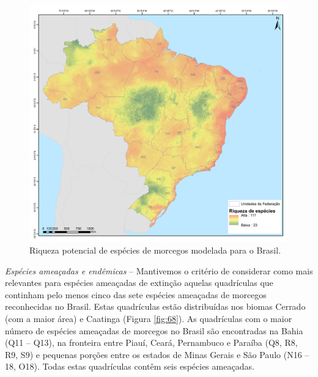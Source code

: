 \documentclass[
  oneside]{scrbook}
\begin{document}
\begin{figure}[H]

{\centering \includegraphics[width=0.75\linewidth]{imagens/cap09/Figura_9.1} 

}

\caption{Riqueza potencial de espécies de morcegos modelada para o Brasil.}\label{fig:67}
\end{figure}

\emph{Espécies ameaçadas e endêmicas} -- Mantivemos o critério de considerar como mais relevantes para espécies ameaçadas de extinção aquelas quadrículas que continham pelo menos cinco das sete espécies ameaçadas de morcegos reconhecidas no Brasil. Estas quadrículas estão distribuídas nos biomas Cerrado (com a maior área) e Caatinga (Figura \ref{fig:68}). As quadrículas com o maior número de espécies ameaçadas de morcegos no Brasil são encontradas na Bahia (Q11 -- Q13), na fronteira entre Piauí, Ceará, Pernambuco e Paraíba (Q8, R8, R9, S9) e pequenas porções entre os estados de Minas Gerais e São Paulo (N16 -- 18, O18). Todas estas quadrículas contêm seis espécies ameaçadas.
\end{document}
